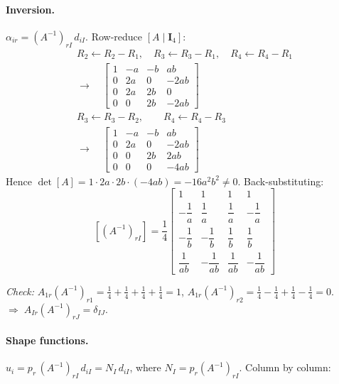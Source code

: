 \documentclass[11pt, a4paper]{article}
\begin{document}
\paragraph{Inversion.}
$\alpha_{ir}=(A^{-1})_{rI}\,d_{iI}$.  Row-reduce $[A\mid\mathbf{I}_4]$:
\begin{gather*}
R_2\leftarrow R_2-R_1,\quad
R_3\leftarrow R_3-R_1,\quad
R_4\leftarrow R_4-R_1
\\[2pt]\longrightarrow\quad
\begin{bmatrix}
1 & -a & -b &  ab\\
0 &  2a & 0 & -2ab\\
0 &  2a & 2b & 0\\
0 &  0  & 2b & -2ab
\end{bmatrix}
\\[6pt]
R_3\leftarrow R_3-R_2,\qquad R_4\leftarrow R_4-R_3
\\[2pt]\longrightarrow\quad
\begin{bmatrix}
1 & -a & -b &  ab\\
0 &  2a & 0 & -2ab\\
0 &  0  & 2b & 2ab\\
0 &  0  & 0  & -4ab
\end{bmatrix}
\end{gather*}
Hence $\det[A]=1\cdot 2a\cdot 2b\cdot(-4ab)=-16a^2b^2\neq 0$.  Back-substituting:
\begin{equation}\label{eq:Ainv}
[(A^{-1})_{rI}]=\frac{1}{4}
\begin{bmatrix}
 1       &  1       &  1       &  1      \\[3pt]
-\dfrac{1}{a} &  \dfrac{1}{a} &  \dfrac{1}{a} & -\dfrac{1}{a}\\[6pt]
-\dfrac{1}{b} & -\dfrac{1}{b} &  \dfrac{1}{b} &  \dfrac{1}{b}\\[6pt]
 \dfrac{1}{ab}& -\dfrac{1}{ab}&  \dfrac{1}{ab}& -\dfrac{1}{ab}
\end{bmatrix}
\end{equation}

\textit{Check:}\; $A_{1r}(A^{-1})_{r1}=\tfrac{1}{4}+\tfrac{1}{4}+\tfrac{1}{4}+\tfrac{1}{4}=1$,\; $A_{1r}(A^{-1})_{r2}=\tfrac{1}{4}-\tfrac{1}{4}+\tfrac{1}{4}-\tfrac{1}{4}=0$.\; $\Rightarrow\;A_{Ir}(A^{-1})_{rJ}=\delta_{IJ}$.\;\checkmark

\paragraph{Shape functions.}
$u_i=p_r\,(A^{-1})_{rI}\,d_{iI}=N_I\,d_{iI}$, where $N_I=p_r(A^{-1})_{rI}$.  Column by column:
\end{document}
